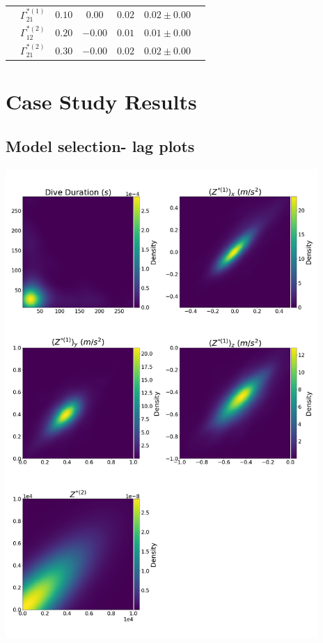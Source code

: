 \documentclass[12pt]{TD-CJS}
\begin{document}
{\begin{tabular}{ccccccc}
                             & $\Gamma^{*(1)}_{21}$          & $0.10$                         & $0.00$                   & $0.02$                           & $0.02 \pm 0.00$                             \\
                             & $\Gamma^{*(2)}_{12}$          & $0.20$                         & $-0.00$                   & $0.01$                           & $0.01 \pm 0.00$                             \\
                             & $\Gamma^{*(2)}_{21}$          & $0.30$                         & $-0.00$                   & $0.02$                           & $0.02 \pm 0.00$                             \\ \hline

\end{tabular}
}

\newpage
\section{Case Study Results}
\subsection{Model selection- lag plots}

\includegraphics[height=7in]{../Plots/lagplot.png}
\end{document}
